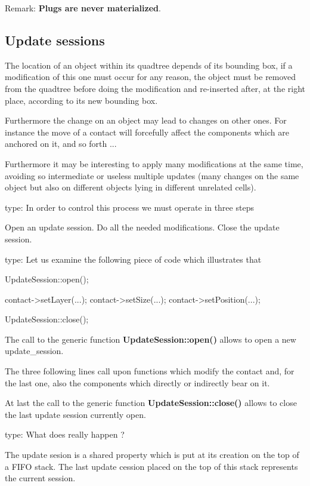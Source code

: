 \begin{DoxyParagraph}{Remark\-:}
{\bfseries Plugs are never materialized}.
\end{DoxyParagraph}
\hypertarget{classHurricane_1_1Go_secGoUpdateSessions}{}\subsection{Update sessions}\label{classHurricane_1_1Go_secGoUpdateSessions}
The location of an object within its quadtree depends of its bounding box, if a modification of this one must occur for any reason, the object must be removed from the quadtree before doing the modification and re-\/inserted after, at the right place, according to its new bounding box.

Furthermore the change on an object may lead to changes on other ones. For instance the move of a contact will forcefully affect the components which are anchored on it, and so forth ...

Furthermore it may be interesting to apply many modifications at the same time, avoiding so intermediate or useless multiple updates (many changes on the same object but also on different objects lying in different unrelated cells).

type\-: In order to control this process we must operate in three steps

Open an update session. Do all the needed modifications. Close the update session.

type\-: Let us examine the following piece of code which illustrates that 
\begin{DoxyCode}
UpdateSession::open();
 
contact->setLayer(...);
contact->setSize(...);
contact->setPosition(...);
 
UpdateSession::close();
\end{DoxyCode}
 The call to the generic function {\bfseries Update\-Session\-::open()} allows to open a new update\-\_\-session.

The three following lines call upon functions which modify the contact and, for the last one, also the components which directly or indirectly bear on it.

At last the call to the generic function {\bfseries Update\-Session\-::close()} allows to close the last update session currently open.

type\-: What does really happen ?

The update sesion is a shared property which is put at its creation on the top of a F\-I\-F\-O stack. The last update cession placed on the top of this stack represents the current session.


